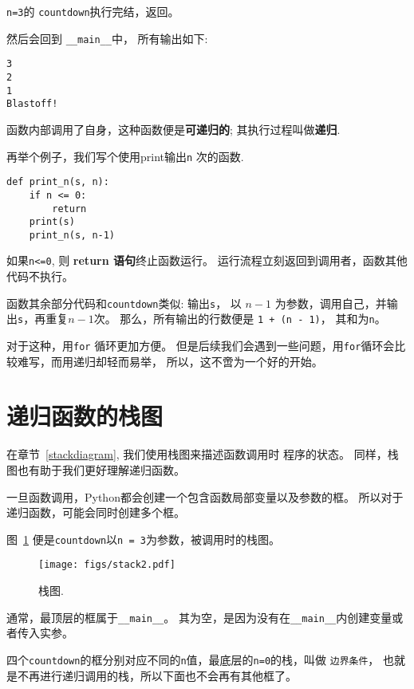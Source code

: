 \documentclass[10pt]{book}
\begin{document}
{\tt n=3}的 {\tt countdown}执行完结，返回。

然后会回到 \verb"__main__"中， 所有输出如下:

\begin{verbatim}
3
2
1
Blastoff!
\end{verbatim}
%
函数内部调用了自身，这种函数便是{\bf 可递归的};
其执行过程叫做{\bf 递归}.

再举个例子，我们写个使用print输出{\tt n} 次的函数.

\begin{verbatim}
def print_n(s, n):
    if n <= 0:
        return
    print(s)
    print_n(s, n-1)
\end{verbatim}
%
如果{\tt n<=0}, 则 {\bf return 语句}终止函数运行。
运行流程立刻返回到调用者，函数其他代码不执行。

函数其余部分代码和{\tt countdown}类似: 
输出{\tt s}， 以 $n-1$ 为参数，调用自己，并输出{\tt s}，再重复$n-1$次。
那么，所有输出的行数便是 {\tt 1 + (n - 1)}， 其和为{\tt n}。

对于这种，用{\tt for} 循环更加方便。
但是后续我们会遇到一些问题，用{\tt for}循环会比较难写，而用递归却轻而易举，
所以，这不啻为一个好的开始。


\section{递归函数的栈图}
\label{recursive.stack}

在章节~\ref{stackdiagram}, 我们使用栈图来描述函数调用时
程序的状态。
同样，栈图也有助于我们更好理解递归函数。

一旦函数调用，Python都会创建一个包含函数局部变量以及参数的框。
所以对于递归函数，可能会同时创建多个框。

图~\ref{fig.stack2} 便是{\tt countdown}以{\tt n = 3}为参数，被调用时的栈图。

\begin{figure}
\centerline
{\texttt{[image: figs/stack2.pdf]}}
\caption{栈图.}
\label{fig.stack2}
\end{figure}

通常，最顶层的框属于\verb"__main__"。
其为空，是因为没有在\verb"__main__"内创建变量或者传入实参。

四个{\tt countdown}的框分别对应不同的{\tt n}值，最底层的{\tt n=0}的栈，叫做
{\tt 边界条件}， 也就是不再进行递归调用的栈，所以下面也不会再有其他框了。
\end{document}
